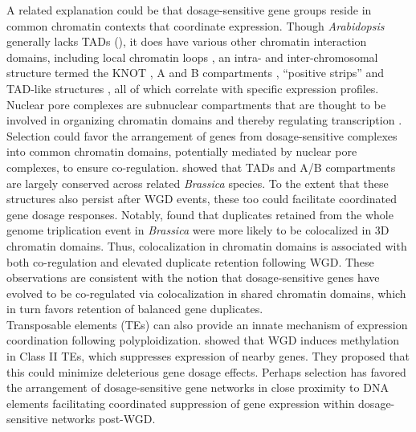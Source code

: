 \documentclass[11pt]{article}
\begin{document}
A related explanation could be that dosage-sensitive gene groups reside in common chromatin contexts that coordinate expression.
Though \textit{Arabidopsis} generally lacks TADs (\citep{liu2017}), it does have various other chromatin interaction domains, including local chromatin loops \citep{liu2017}, an intra- and inter-chromosomal structure termed the KNOT \citep{grob2014, grob2017}, A and B compartments \citep{grob2014}, ``positive strips'' and TAD-like structures \citep{wang2015}, all of which  correlate with specific expression profiles.
Nuclear pore complexes are subnuclear compartments that are thought to be involved in organizing chromatin domains and thereby regulating transcription \citep{sun2019}.
Selection could favor the arrangement of genes from dosage-sensitive complexes into common chromatin domains, potentially mediated by nuclear pore complexes, to ensure co-regulation.
\cite{xie2019} showed that TADs and A/B compartments are largely conserved across related \textit{Brassica} species.
To the extent that these structures also persist after WGD events, these too could facilitate coordinated gene dosage responses.
Notably, \cite{xie2019} found that duplicates retained from the whole genome triplication event in \textit{Brassica} were more likely to be colocalized in 3D chromatin domains.
Thus, colocalization in chromatin domains is associated with both co-regulation and elevated duplicate retention following WGD.
These observations are consistent with the notion that dosage-sensitive genes have evolved to be co-regulated via colocalization in shared chromatin domains, which in turn favors retention of balanced gene duplicates.\\

Transposable elements (TEs) can also provide an innate mechanism of expression coordination following polyploidization.
\cite{zhang2015} showed that WGD induces methylation in Class II TEs, which suppresses expression of nearby genes.
They proposed that this could minimize deleterious gene dosage effects.
Perhaps selection has favored the arrangement of dosage-sensitive gene networks in close proximity to DNA elements facilitating coordinated suppression of gene expression within dosage-sensitive networks post-WGD.\\
\end{document}
